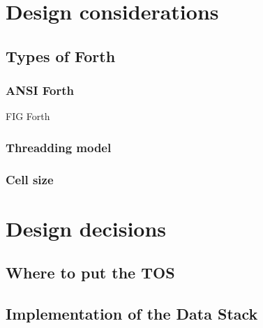 
\section{Design considerations}

\subsection{Types of Forth}

\subsubsection{ANSI Forth}

FIG Forth


\subsubsection{Threadding model}


\subsubsection{Cell size}



\section{Design decisions}

\subsection{Where to put the TOS}

\subsection{Implementation of the Data Stack}
